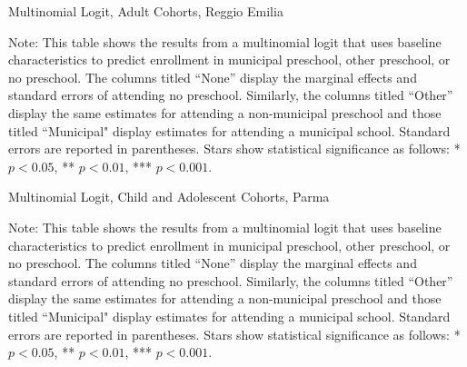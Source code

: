\begin{table}[H]
\centering
\caption{Multinomial Logit, Adult Cohorts, Reggio Emilia} \label{mlogit-adult-RE}
\begin{adjustbox}{width=\textwidth}
\begin{threeparttable}

\begin{tablenotes}
\footnotesize\raggedright{Note: This table shows the results from a multinomial logit that uses baseline characteristics to predict enrollment in municipal preschool, other preschool, or no preschool. The columns titled ``None'' display the marginal effects and standard errors of attending no preschool. Similarly, the columns titled ``Other'' display the same estimates for attending a non-municipal preschool and those titled ``Municipal" display estimates for attending a municipal school. Standard errors are reported in parentheses. Stars show statistical significance as follows: * $p < 0.05$, ** $p < 0.01$, *** $p < 0.001$.}
\end{tablenotes}
\end{threeparttable}
\end{adjustbox}
\end{table}

\begin{table}[H]
\centering
\caption{Multinomial Logit, Child and Adolescent Cohorts, Parma} \label{mlogit-chi-ado-PR}
\begin{adjustbox}{width=\textwidth}
\begin{threeparttable}

\begin{tablenotes}
\footnotesize\raggedright{Note: This table shows the results from a multinomial logit that uses baseline characteristics to predict enrollment in municipal preschool, other preschool, or no preschool. The columns titled ``None'' display the marginal effects and standard errors of attending no preschool. Similarly, the columns titled ``Other'' display the same estimates for attending a non-municipal preschool and those titled ``Municipal" display estimates for attending a municipal school. Standard errors are reported in parentheses. Stars show statistical significance as follows: * $p < 0.05$, ** $p < 0.01$, *** $p < 0.001$.}
\end{tablenotes}
\end{threeparttable}
\end{adjustbox}
\end{table}

